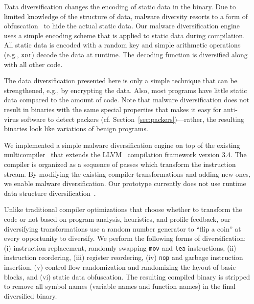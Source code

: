 \documentclass[letterpaper,twocolumn,10pt]{article}
\begin{document}
Data diversification changes the encoding of static data in the binary. Due to
limited knowledge of the structure of data, malware diversity resorts to a form
of obfuscation~\cite{collberg97} to hide the actual static data. Our malware
diversification engine uses a simple encoding scheme that is applied to static
data during compilation. All static data is encoded with a random key and simple
arithmetic operations (e.g., \texttt{xor}) decode the data at runtime. The
decoding function is diversified along with all other code. 

The data diversification presented here is only a simple technique that can be
strengthened, e.g., by encrypting the data. Also, most programs have
little static data compared to the amount of code. Note that malware diversification 
does not result in binaries with the same special properties that makes it easy for 
anti-virus software to detect packers (cf. Section~\ref{sec:packers})---rather, 
the resulting binaries look like variations of benign programs. %


We implemented a simple malware diversification engine on top of the existing
multicompiler~\cite{multicompiler, payer14syscan} that extends the
LLVM~\cite{lattner04cgo} compilation framework version 3.4. The compiler is
organized as a sequence of passes which transform the instruction stream. By
modifying the existing compiler transformations and adding new ones, we enable
malware diversification.  Our prototype currently does not use runtime data
structure diversification~\cite{Lin09DIMVA}.

Unlike traditional compiler optimizations that choose whether to transform the
code or not based on program analysis, heuristics, and profile feedback, our diversifying
transformations use a random number generator to ``flip a coin'' at every
opportunity to diversify. We perform the following forms of diversification: (i)
instruction replacement, randomly swapping \texttt{mov} and \texttt{lea}
instructions, (ii) instruction reordering, (iii) register reordering, (iv)
\texttt{nop} and garbage instruction insertion, (v) control flow randomization
and randomizing the layout of basic blocks, and (vi) static data obfuscation.
The resulting compiled binary is stripped to remove all symbol names (variable
names and function names) in the final diversified binary.
\end{document}
